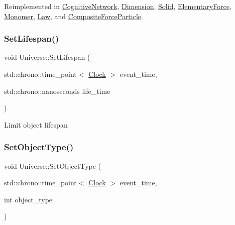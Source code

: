 Reimplemented in \mbox{\hyperlink{classCognitiveNetwork_af9f082a70f0cc25a3f818d9eace5a527}{Cognitive\+Network}}, \mbox{\hyperlink{classDimension_aeec6887382d09e3d78382582ff4e7c33}{Dimension}}, \mbox{\hyperlink{classSolid_ae237f2c713868c133e28ed7f75fc9125}{Solid}}, \mbox{\hyperlink{classElementaryForce_aa36d5875964f7e2fc981f6fc5431be7f}{Elementary\+Force}}, \mbox{\hyperlink{classMonomer_ab38d44b27a46d5630aeb5e889f927c09}{Monomer}}, \mbox{\hyperlink{classLaw_a908ccc2b0a561a7324a15393ec157219}{Law}}, and \mbox{\hyperlink{classCompositeForceParticle_ad9e1553ab0096230edd591e3135b223d}{Composite\+Force\+Particle}}.

\mbox{\label{classUniverse_ac3443dd59b61ae3110f07f681f63ed0a}} 
\subsubsection{\texorpdfstring{Set\+Lifespan()}{SetLifespan()}}
{\footnotesize\ttfamily void Universe\+::\+Set\+Lifespan (\begin{DoxyParamCaption}\item[{std\+::chrono\+::time\+\_\+point$<$ \mbox{\hyperlink{universe_8h_a0ef8d951d1ca5ab3cfaf7ab4c7a6fd80}{Clock}} $>$}]{event\+\_\+time,  }\item[{std\+::chrono\+::nanoseconds}]{life\+\_\+time }\end{DoxyParamCaption})}

Limit object lifespan\mbox{\label{classUniverse_a2274a54fbdc7504c897e4272162bf17a}} 
\subsubsection{\texorpdfstring{Set\+Object\+Type()}{SetObjectType()}}
{\footnotesize\ttfamily void Universe\+::\+Set\+Object\+Type (\begin{DoxyParamCaption}\item[{std\+::chrono\+::time\+\_\+point$<$ \mbox{\hyperlink{universe_8h_a0ef8d951d1ca5ab3cfaf7ab4c7a6fd80}{Clock}} $>$}]{event\+\_\+time,  }\item[{int}]{object\+\_\+type }\end{DoxyParamCaption})}

